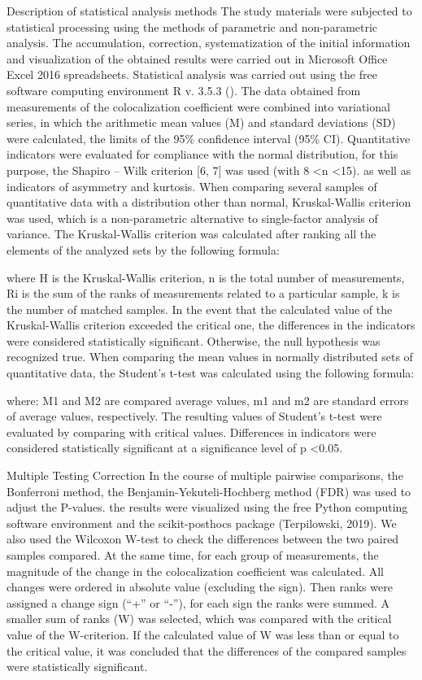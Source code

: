 \documentclass[a4paper,12pt]{article}
\begin{document}
Description of statistical analysis methods
The study materials were subjected to statistical processing using the methods of parametric and non-parametric analysis. The accumulation, correction, systematization of the initial information and visualization of the obtained results were carried out in Microsoft Office Excel 2016 spreadsheets.
Statistical analysis was carried out using the free software computing environment R v. 3.5.3 (\cite{team2014r}).
The data obtained from measurements of the colocalization coefficient were combined into variational series, in which the arithmetic mean values (M) and standard deviations (SD) were calculated, the limits of the 95\% confidence interval (95\% CI).
Quantitative indicators were evaluated for compliance with the normal distribution, for this purpose, the Shapiro – Wilk criterion [6, 7] was used (with 8 <n <15).
as well as indicators of asymmetry and kurtosis.
When comparing several samples of quantitative data with a distribution other than normal, Kruskal-Wallis criterion was used, which is a non-parametric alternative to single-factor analysis of variance. The Kruskal-Wallis criterion was calculated after ranking all the elements of the analyzed sets by the following formula:



where H is the Kruskal-Wallis criterion, n is the total number of measurements, Ri is the sum of the ranks of measurements related to a particular sample, k is the number of matched samples.
In the event that the calculated value of the Kruskal-Wallis criterion exceeded the critical one, the differences in the indicators were considered statistically significant. Otherwise, the null hypothesis was recognized true.
When comparing the mean values in normally distributed sets of quantitative data, the Student’s t-test was calculated using the following formula:

where: M1 and M2 are compared average values, m1 and m2 are standard errors of average values, respectively. The resulting values of Student's t-test were evaluated by comparing with critical values. Differences in indicators were considered statistically significant at a significance level of p <0.05.

Multiple Testing Correction
In the course of multiple pairwise comparisons, the Bonferroni method, the Benjamin-Yekuteli-Hochberg method (FDR) was used to adjust the P-values.
the results were visualized using the free Python computing software environment and the scikit-posthocs package (Terpilowski, 2019).
We also used the Wilcoxon W-test to check the differences between the two paired samples compared. At the same time, for each group of measurements, the magnitude of the change in the colocalization coefficient was calculated. All changes were ordered in absolute value (excluding the sign). Then ranks were assigned a change sign (“+” or “-”), for each sign the ranks were summed. A smaller sum of ranks (W) was selected, which was compared with the critical value of the W-criterion. If the calculated value of W was less than or equal to the critical value, it was concluded that the differences of the compared samples were statistically significant.
\end{document}
